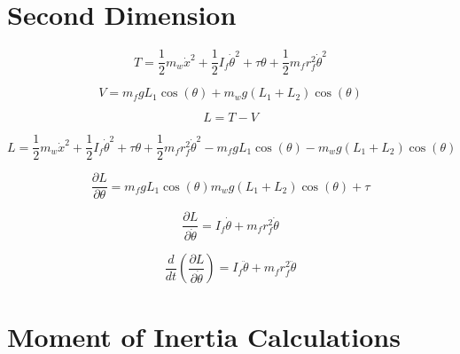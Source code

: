 \documentclass{article}
\begin{document}
\newpage

 
\section{Second Dimension}

 
 
\begin{equation}
T = \frac{1}{2} m_{w} \dot{x}^2 + \frac{1}{2} I_{f} \dot{\theta}^2 + \tau \theta + \frac{1}{2} m_{f} r_{f}^2 \dot{\theta}^2
\end{equation}

\begin{equation}
V = m_{f} g L_{1} \cos(\theta) + m_{w} g (L_{1} + L_{2}) \cos(\theta)
\end{equation}

\begin{equation}
L = T - V
\end{equation}

\begin{equation}
L = \frac{1}{2} m_{w} \dot{x}^2 + \frac{1}{2} I_{f} \dot{\theta}^2 + \tau \theta + \frac{1}{2} m_{f} r_{f}^2 \dot{\theta}^2 - m_{f} g L_{1} \cos(\theta) - m_{w} g (L_{1} + L_{2}) \cos(\theta)
\end{equation}

\begin{equation}
\frac{\partial{L}}{\partial{{\theta}}} =  m_{f} g L_{1} \cos(\theta)  m_{w} g (L_{1} + L_{2}) \cos(\theta) + \tau
\end{equation}

\begin{equation}
\frac{\partial{L}}{\partial{\dot{\theta}}} = I_{f} \dot{\theta} + m_{f} r_{f}^2 \dot{\theta}
\end{equation}

\begin{equation}
\frac{d}{dt} \left(\frac{\partial{L}}{\partial{\dot{\theta}}}\right) = I_{f} \ddot{\theta} + m_{f} r_{f}^2 \ddot{\theta}
\end{equation}



\section{Moment of Inertia Calculations}

 
 
\end{document}
